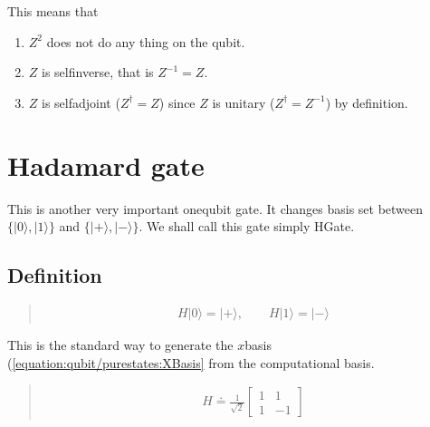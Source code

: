 \documentclass[letterpaper,10pt,english]{jupyterBook}
\begin{document}
\sphinxAtStartPar
This means that
\begin{enumerate}
%
\item {}
\sphinxAtStartPar
\(Z^2\) does not do any thing on the qubit.

\item {}
\sphinxAtStartPar
\(Z\) is  self\sphinxhyphen{}inverse, that is \(Z^{-1} = Z\).

\item {}
\sphinxAtStartPar
\(Z\) is self\sphinxhyphen{}adjoint (\(Z^\dagger = Z\)) since \(Z\) is unitary (\(Z^\dagger = Z^{-1}\)) by definition.

\end{enumerate}

\sphinxstepscope


\section{Hadamard gate}
\label{\detokenize{q1gates/h:hadamard-gate}}\label{\detokenize{q1gates/h:sec-hgate}}\label{\detokenize{q1gates/h::doc}}
\sphinxAtStartPar
This is another very important one\sphinxhyphen{}qubit gate.  It changes basis set between \(\{|0\rangle,|1\rangle\}\) and \(\{|+\rangle,|-\rangle\}\).  We shall call this gate simply HGate.

\sphinxAtStartPar
{}


\subsection{Definition}
\label{\detokenize{q1gates/h:definition}}
\sphinxAtStartPar
{}
\begin{quote}
\begin{equation}\label{equation:q1gates/h:HGate}
\begin{split}
H |0\rangle = |+\rangle, \qquad H |1\rangle = |-\rangle
\end{split}
\end{equation}\end{quote}

\sphinxAtStartPar
This is the standard way to generate the \(x\)\sphinxhyphen{}basis (\eqref{equation:qubit/purestates:XBasis} from the computational basis.

\sphinxAtStartPar
{}
\begin{quote}
\begin{equation}\label{equation:q1gates/h:HGate-matrix}
\begin{split}
H \doteq \frac{1}{\sqrt{2}} \begin{bmatrix} 1 & 1 \\ 1 & -1 \end{bmatrix}
\end{split}
\end{equation}\end{quote}
\end{document}
